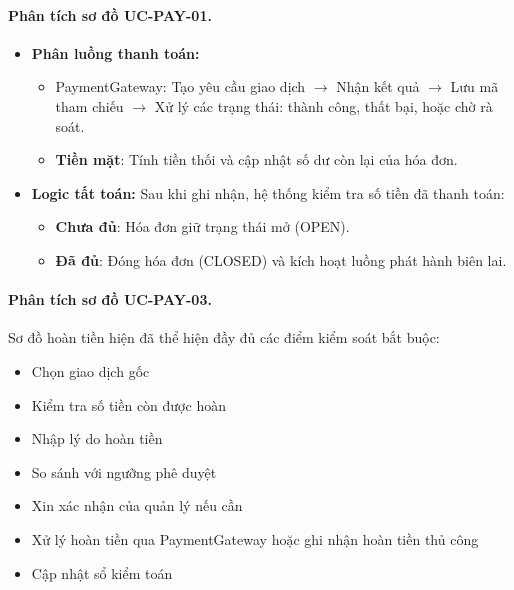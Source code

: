 
\paragraph{Phân tích sơ đồ UC-PAY-01.}
\begin{itemize}
    \item \textbf{Phân luồng thanh toán:}
    \begin{itemize}
        \item \textsf{PaymentGateway}: Tạo yêu cầu giao dịch $\rightarrow$ Nhận kết quả $\rightarrow$ Lưu mã tham chiếu $\rightarrow$ Xử lý các trạng thái: thành công, thất bại, hoặc chờ rà soát.
        \item \textbf{Tiền mặt}: Tính tiền thối và cập nhật số dư còn lại của hóa đơn.
    \end{itemize}
    \item \textbf{Logic tất toán:} Sau khi ghi nhận, hệ thống kiểm tra số tiền đã thanh toán:
    \begin{itemize}
        \item \textbf{Chưa đủ}: Hóa đơn giữ trạng thái mở (\textsf{OPEN}).
        \item \textbf{Đã đủ}: Đóng hóa đơn (\textsf{CLOSED}) và kích hoạt luồng phát hành biên lai.
    \end{itemize}
\end{itemize}


\paragraph{Phân tích sơ đồ UC-PAY-03.}
Sơ đồ hoàn tiền hiện đã thể hiện đầy đủ các điểm kiểm soát bắt buộc:

\begin{itemize}
    \item Chọn giao dịch gốc
    \item Kiểm tra số tiền còn được hoàn
    \item Nhập lý do hoàn tiền
    \item So sánh với ngưỡng phê duyệt
    \item Xin xác nhận của quản lý nếu cần
    \item Xử lý hoàn tiền qua \textsf{PaymentGateway} hoặc ghi nhận hoàn tiền thủ công
    \item Cập nhật sổ kiểm toán
\end{itemize}

